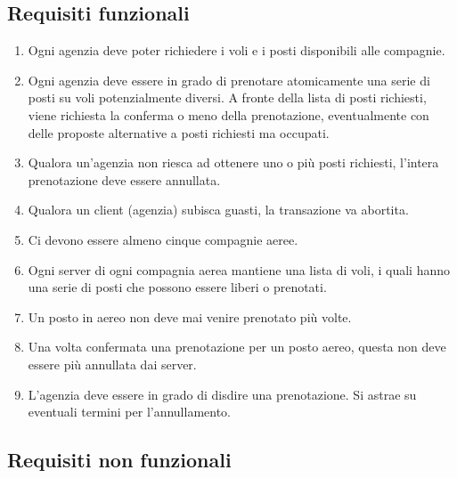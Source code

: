 \documentclass[a4paper]{article}
\begin{document}
\subsection{Requisiti funzionali}
\begin{enumerate}
	\item Ogni agenzia deve poter richiedere i voli e i posti disponibili alle compagnie.
	\item Ogni agenzia deve essere in grado di prenotare atomicamente una serie di posti su voli potenzialmente diversi. A fronte della lista di posti richiesti, viene richiesta la conferma o meno della prenotazione, eventualmente con delle proposte alternative a posti richiesti ma occupati.
	\item Qualora un'agenzia non riesca ad ottenere uno o più posti richiesti, l'intera prenotazione deve essere annullata.
	\item Qualora un client (agenzia) subisca guasti, la transazione va abortita.
	\item Ci devono essere almeno cinque compagnie aeree.
	\item Ogni server di ogni compagnia aerea mantiene una lista di voli, i quali hanno una serie di posti che possono essere liberi o prenotati.
	\item Un posto in aereo non deve mai venire prenotato più volte.
	\item Una volta confermata una prenotazione per un posto aereo, questa non deve essere più annullata dai server.
	\item L'agenzia deve essere in grado di disdire una prenotazione. Si astrae su eventuali termini per l'annullamento.
\end{enumerate}

\subsection{Requisiti non funzionali}
\end{document}
